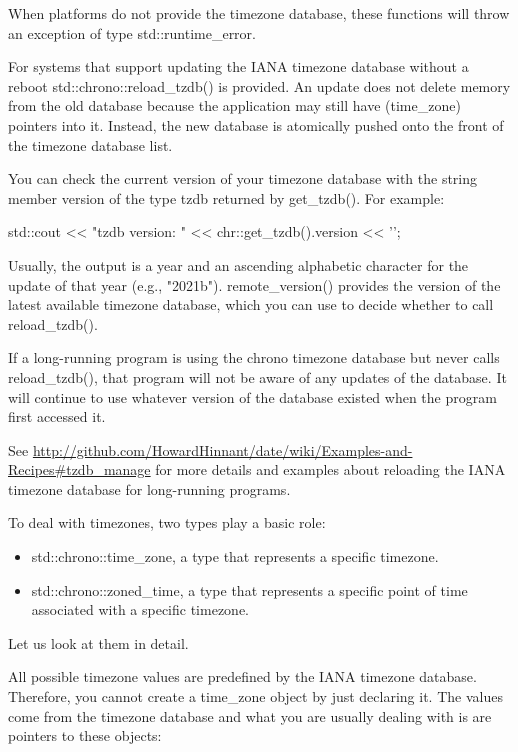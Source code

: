 When platforms do not provide the timezone database, these functions will throw an exception of type std::runtime\_error.

For systems that support updating the IANA timezone database without a reboot std::chrono::reload\_tzdb() is provided. An update does not delete memory from the old database because the application may still have (time\_zone) pointers into it. Instead, the new database is atomically pushed onto the front of the timezone database list.

You can check the current version of your timezone database with the string member version of the type tzdb returned by get\_tzdb(). For example:

\begin{cpp}
std::cout << "tzdb version: " << chr::get_tzdb().version << '\n';
\end{cpp}

Usually, the output is a year and an ascending alphabetic character for the update of that year (e.g., "2021b"). remote\_version() provides the version of the latest available timezone database, which you can use to decide whether to call reload\_tzdb().

If a long-running program is using the chrono timezone database but never calls reload\_tzdb(), that program will not be aware of any updates of the database. It will continue to use whatever version of the database existed when the program first accessed it.

See \url{http://github.com/HowardHinnant/date/wiki/Examples-and-Recipes#tzdb_manage} for more details and examples about reloading the IANA timezone database for long-running programs.


To deal with timezones, two types play a basic role:

\begin{itemize}
\item 
std::chrono::time\_zone, a type that represents a specific timezone.

\item 
std::chrono::zoned\_time, a type that represents a specific point of time associated with a specific timezone.
\end{itemize}

Let us look at them in detail.


All possible timezone values are predefined by the IANA timezone database. Therefore, you cannot create a time\_zone object by just declaring it. The values come from the timezone database and what you are usually dealing with is are pointers to these objects:

